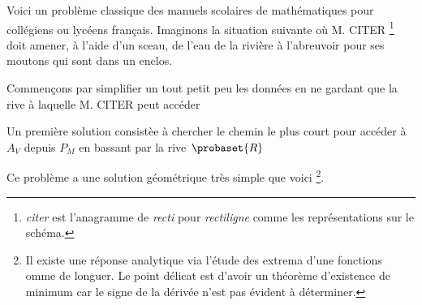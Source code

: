 Voici un problème classique des manuels scolaires de mathématiques pour collégiens ou lycéens français. Imaginons la situation suivante où M. CITER
\footnote{
	\emph{\og citer \fg} est l'anagramme de \emph{\og recti \fg} pour \emph{\og rectiligne \fg} comme les représentations sur le schéma.
}
doit amener, à l'aide d'un sceau, de l'eau de la rivière à l'abreuvoir pour ses moutons qui sont dans un enclos.

\smallskip
\begin{center}
\end{center}


\medskip


Commençons par simplifier un tout petit peu les données en ne gardant que la rive à laquelle M. CITER peut accéder

\smallskip
\begin{center}
\end{center}


\medskip


Un première solution consistèe à chercher le chemin le plus court pour accéder à $A_V$ depuis $P_M$ en bassant par la rive $\probaset{R}$

Ce problème a une solution géométrique très simple que voici
\footnote{
	Il existe une réponse analytique via l'étude des extrema d'une fonctions omme de longuer. Le point délicat est d'avoir un théorème d'existence de minimum car le signe de la dérivée n'est pas évident à déterminer.
}.

\smallskip
\begin{center}
\end{center}


